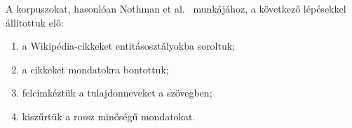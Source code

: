 \documentclass{llncs}
\begin{document}




A korpuszokat, hasonlóan Nothman et al.~\cite{Nothman:08} munkájához, a következő
lépésekkel állítottuk elő:
 
\begin{enumerate}
\item a Wikipédia-cikkeket entitásosztályokba soroltuk;
\item a cikkeket mondatokra bontottuk;
\item felcímkéztük a tulajdonneveket a szövegben;
\item kiszűrtük a rossz minőségű mondatokat.
\end{enumerate}
\end{document}
